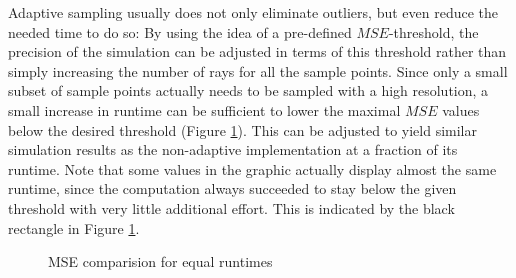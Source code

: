 Adaptive sampling usually does not only eliminate outliers, but even reduce the
needed time to do so: By using the idea of a pre-defined $MSE$-threshold, the
precision of the simulation can be adjusted in terms of this threshold rather than
simply increasing the number of rays for all the sample points. Since only a
small subset of sample points actually needs to be sampled with a high
resolution, a small increase in runtime can be sufficient to lower the maximal
$MSE$ values below the desired threshold (Figure \ref{plot:adaptive_runtime}).
This can be adjusted to yield similar simulation results as the non-adaptive
implementation at a fraction of its runtime. Note that some values in the
graphic actually display almost the same runtime, since the computation always
succeeded to stay below the given threshold with very little additional effort.
This is indicated by the black rectangle in Figure \ref{plot:adaptive_runtime}.
\begin{figure}[H]
  \centerline{
    }
  \caption{MSE comparision for equal runtimes}
  \label{plot:adaptive_runtime}
\end{figure}

